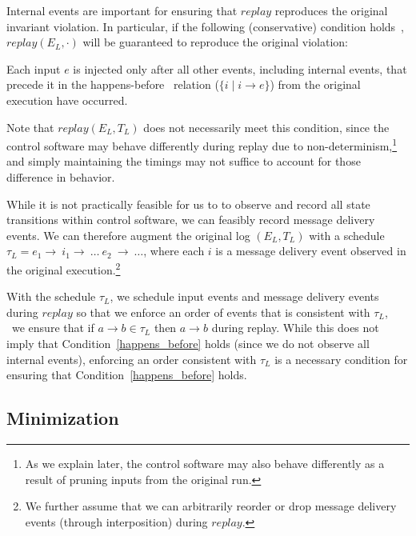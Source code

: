 Internal events are important for ensuring that $replay$ reproduces the
original invariant violation. In particular, if the following (conservative) condition holds~\cite{tel2000introduction}, $replay(E_L, \cdot)$ will be
guaranteed to reproduce the original violation:

\begin{condition}
\label{happens_before}
Each input $e$ is injected only after all other events, including internal events, that precede it in the
happens-before~\cite{Lamport:1978:TCO:359545.359563} relation ($\{i \mid i \rightarrow e\}$) from the
original execution have occurred.
\end{condition}

\noindent Note that $replay(E_L, T_L)$ does not necessarily meet this condition, since the control software may behave
differently during replay due to non-determinism,\footnote{As we explain
later, the control software may also behave differently as a result of
pruning inputs from the original run.} and simply maintaining the timings may not suffice
to account for those difference in behavior.

While it is not practically feasible for us to to observe and record all state
transitions within control software, we can feasibly record message delivery
events. We can therefore augment the original log $(E_L, T_L)$ with a schedule
$\tau_L = e_1\rightarrow~i_1\rightarrow~\dots~e_2~\rightarrow~\dots$, where
each $i$ is a message delivery event observed in the original
execution.\footnote{We further assume that we can arbitrarily reorder or
drop message delivery events (through interposition) during $replay$.}

With the schedule $\tau_L$, we schedule input events and message delivery
events during $replay$ so that we enforce an order
of events that is consistent with $\tau_L$, \ie~we ensure that
if $a \rightarrow b\in \tau_L$ then $a \rightarrow b$ during replay.
While this does not imply that
Condition~\ref{happens_before} holds (since we do not observe all internal
events), enforcing an order consistent with
$\tau_L$ is a necessary condition for ensuring that
Condition~\ref{happens_before} holds.

\subsection{Minimization}

